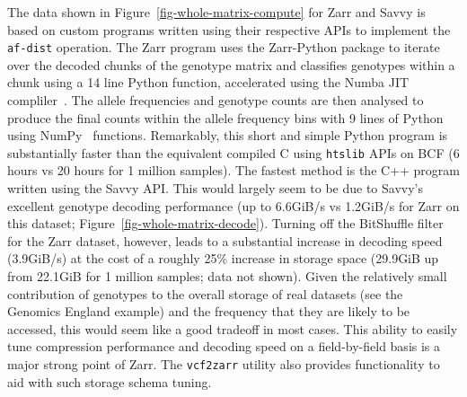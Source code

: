 \documentclass[a4paper,num-refs]{oup-contemporary}
\begin{document}
The data shown in Figure~\ref{fig-whole-matrix-compute} for Zarr and Savvy
is based on custom programs written using their respective APIs
to implement the \texttt{af-dist} operation. The Zarr program uses
the Zarr-Python package to iterate over the decoded chunks of the 
genotype matrix and classifies genotypes within a chunk using a 14 line Python
function, accelerated using the Numba JIT compliler~\cite{lam2015numba}.
The allele frequencies and genotype counts are then analysed to produce 
the final counts within the allele frequency bins with 9 lines of 
Python using NumPy~\cite{harris2020array} functions. Remarkably, this 
short and simple Python program is substantially faster than the 
equivalent compiled C using \texttt{htslib} APIs on BCF (6 hours
vs 20 hours for 1 million samples). The fastest method is the 
C++ program written using the Savvy API. This would largely seem
to be due to Savvy's excellent genotype decoding performance
(up to 6.6GiB/s vs 1.2GiB/s for Zarr on this dataset;
Figure~\ref{fig-whole-matrix-decode}).
Turning off the BitShuffle filter for the Zarr dataset,
however, leads to a substantial increase in decoding speed
(3.9GiB/s) at the cost of a roughly 25\% increase in storage
space (29.9GiB up from 22.1GiB for 1 million samples; data not
shown). Given the relatively small contribution of genotypes to the
overall storage of real datasets (see the Genomics England example)
and the frequency that they are likely to be accessed, this
would seem like a good tradeoff in most cases.
This ability to easily tune compression performance
and decoding speed on a field-by-field basis is a major strong
point of Zarr. The \texttt{vcf2zarr} utility also provides
functionality to aid with such storage schema tuning.
\end{document}
